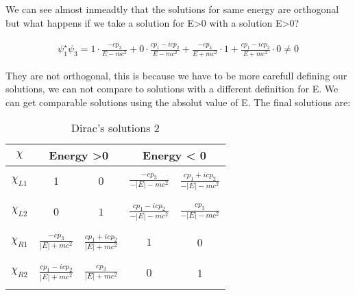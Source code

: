 We can see almost inmeadtly that the solutions for same energy are orthogonal but what happens if we take a solution for E>0 with a solution E>0?

\begin{equation}
  \begin{array}{c}
    \psi_1^\star\psi_3 = 1 \cdot \frac{-cp_3}{E-mc^2} + 0 \cdot \frac{cp_1-icp_2}{E-mc^2} + \frac{-cp_3}{E+mc^2} \cdot 1 + \frac{cp_1-icp_2}{E+mc^2} \cdot 0 \neq 0
  \end{array}
\end{equation}

They are not orthogonal, this is because we have to be more carefull defining our solutions, we can not compare to solutions with a different definition for E. We can get comparable solutions using the absolut value of E. The final solutions are:

\begin{table}[H]
  \begin{tabular}{|c|c|c|c|c|}
    \hline

    $\chi$ & \multicolumn{2}{|c|}{Energy >0} & \multicolumn{2}{|c|}{Energy < 0}\\
    \hline
    & & & &\\
    $\chi_{L1}$ & $1$                         & $0$                             & $\frac{-cp_3}{-|E|-mc^2}$            & $\frac{cp_1 +icp_2}{-|E|-mc^2}$ \\
    & & & &\\
    \hline
    & & & &\\
    $\chi_{L2}$& $0$                          & $1$                             & $\frac{cp_1 -icp_2}{-|E|-mc^2}$      & $\frac{cp_3}{-|E|-mc^2}$ \\
    & & & &\\
    \hline
    & & & &\\
    $\chi_{R1}$ & $\frac{-cp_3}{|E|+mc^2}$      & $\frac{cp_1+icp_2}{|E|+mc^2}$     & $1$                               & 0 \\
    & & & &\\
    \hline
    & & & &\\
    $\chi_{R2}$ & $\frac{cp_1-icp_2}{|E|+mc^2}$ & $\frac{cp_3}{|E|+mc^2}$           & $0$                               & 1 \\
    & & & &\\
    \hline
  \end{tabular}
  \caption{Dirac's solutions 2}
\end{table}


